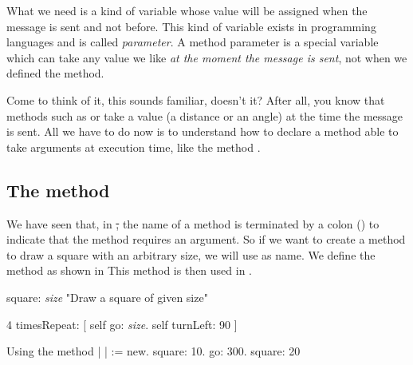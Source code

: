 What we need is a kind of variable whose value will be assigned when the message \newcommand{\replace}[2]{will be}{is} sent\newcommand{\add}[1]{,} and not before. This kind of \newcommand{\replace}[2]{variables exist}{variable exists} in \newcommand{\add}[1]{many} programming languages and \newcommand{\replace}[2]{are}{is} called \newcommand{\add}[1]{a} \emph{parameter}. A method parameter is a special variable which can take any value we like \emph{at the moment the message is sent}, \newcommand{\remove}[1]{and} not when we defined the method.

Come to think of it, this sounds familiar, doesn't it? After all, you know that methods such as \go or \turnLeft take a value (a distance or an angle) at the time the message is sent. All we have to do now is to understand how \newcommand{\replace}[2]{do we}{to} declare a method able to take arguments at execution time, \newcommand{\remove}[1]{just} like the method \go\newcommand{\add}[1]{ can}.

\subsection{The method }
We have seen that, in \st, the name of a method is terminated by a colon (\ct{:}) to indicate that the method requires an argument. \newcommand{\replace}[2]{Thus,}{So} if we want to create a method to draw a square with an arbitrary size, we will use  as \newcommand{\add}[1]{its} name. We define the method  as shown in \newcommand{\add}[1]{. }
This method is then \newcommand{\replace}[2]{invoked}{used} in \newcommand{\remove}[1]{the} .

\begin{method}\label{mth:squareArguments}
square: \emph{size}
   "Draw a square of \newcommand{\add}[1]{the} given size"

   4 timesRepeat: 
                    [ self go: \emph{size}.
                    self turnLeft: 90 ]
\end{method}

\begin{scriptwithtitle}{Using the method }\label{scr:usesquare}
| \caro |
\caro := \Turtle new.
\caro square: 10.
\caro go: 300.
\caro square: 20
\end{scriptwithtitle}


